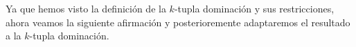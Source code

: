 \documentclass{article}
\begin{document}
	
	
Ya que hemos visto la definición de la $k$-tupla dominación y sus restricciones, ahora veamos la siguiente afirmación y posterioremente adaptaremos el resultado a la $k$-tupla dominación.\\

\end{document}
